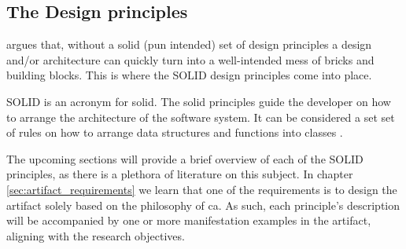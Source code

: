 \subsection{The Design principles} \label{subsec:design_principles}

 argues that, without a solid (pun intended) set of
design principles a design and/or architecture can quickly turn into a well-intended mess
of bricks and building blocks. This is where the SOLID design principles come into place.

SOLID is an acronym for \gls{solid}. The \gls{solid} principles guide the developer on how
to arrange the architecture of the software system. It can be considered a set set of
rules on how to arrange data structures and functions into classes
\parencite[78]{robert_c_martin_clean_2018}.

The upcoming sections will provide a brief overview of each of the SOLID principles, as
there is a plethora of literature on this subject. In chapter
\ref{sec:artifact_requirements} we learn that one of the requirements is to design the
artifact solely based on the philosophy of \gls{ca}. As such, each principle's description
will be accompanied by one or more manifestation examples in the artifact, aligning with
the research objectives.